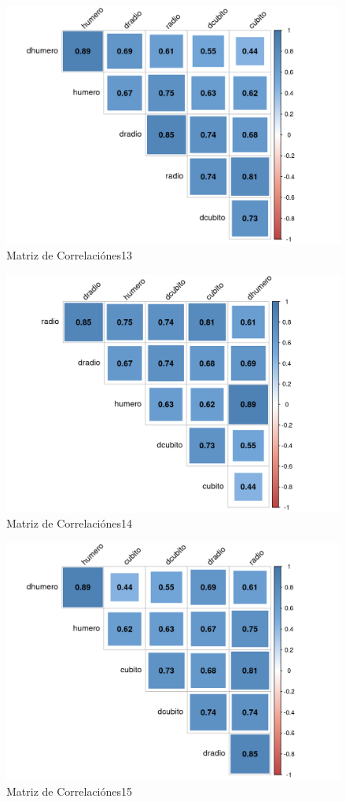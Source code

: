 \documentclass[12pt,a4paper,]{book}
\numberwithin{dummy}{section}
\theoremstyle{ocrenumbox}
\theoremstyle{ocrenumbox}
\theoremstyle{ocrenumbox}
\theoremstyle{ocrenumbox}
\theoremstyle{ocrenum}
\begin{document}
\begin{figure}[H]

{\centering \includegraphics[width=0.6\linewidth]{figurasR/grafica1u-1} 

}

\caption{Matriz de Correlaciónes13}\label{fig:grafica1u}
\end{figure}

\begin{figure}[H]

{\centering \includegraphics[width=0.6\linewidth]{figurasR/grafica1v-1} 

}

\caption{Matriz de Correlaciónes14}\label{fig:grafica1v}
\end{figure}

\begin{figure}[H]

{\centering \includegraphics[width=0.6\linewidth]{figurasR/grafica1w-1} 

}

\caption{Matriz de Correlaciónes15}\label{fig:grafica1w}
\end{figure}




\end{document}
